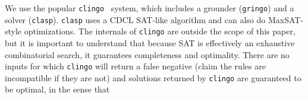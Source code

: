 We use the popular {\tt clingo}~\cite{gebser+:aicomm11} system, which includes a
grounder ({\tt gringo}) and a solver ({\tt clasp}).
\texttt{clasp} uses a CDCL SAT-like algorithm and can also do MaxSAT-style
optimizations.
%
The internals of {\tt clingo} are outside the scope of this paper, but it is important
to understand that because SAT is effectively an exhaustive combinatorial search, it
guarantees completeness and optimality. There are no inputs for which {\tt clingo} will
return a false negative (claim the rules are incompatible if they are not) and solutions
returned by {\tt clingo} are guaranteed to be optimal, in the sense that
